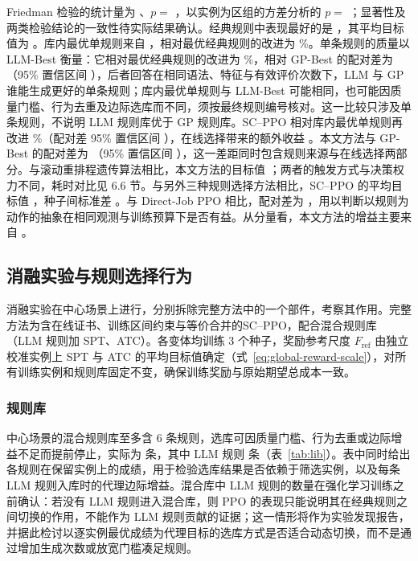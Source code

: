 Friedman 检验的统计量为 \tbd[※]、$p=$ \tbd[※]，以实例为区组的方差分析的 $p=$ \tbd[※]；显著性及两类检验结论的一致性待实际结果确认。经典规则中表现最好的是 \tbd[规则名]，其平均目标值为 \tbd[※]。库内最优单规则来自 ，相对最优经典规则的改进为 \tbd[※]\%。单条规则的质量以 LLM-Best 衡量：它相对最优经典规则的改进为 \tbd[※]\%，相对 GP-Best 的配对差为 \tbd[※]（95\% 置信区间 \tbd[※]），后者回答在相同语法、特征与有效评价次数下，LLM 与 GP 谁能生成更好的单条规则；库内最优单规则与 LLM-Best 可能相同，也可能因质量门槛、行为去重及边际选库而不同，须按最终规则编号核对。这一比较只涉及单条规则，不说明 LLM 规则库优于 GP 规则库。SC--PPO 相对库内最优单规则再改进 \tbd[※]\%（配对差 95\% 置信区间 \tbd[※]），在线选择带来的额外收益 \tbd[显著/不显著]。本文方法与 GP-Best 的配对差为 \tbd[※]（95\% 置信区间 \tbd[※]），这一差距同时包含规则来源与在线选择两部分。与滚动重排程遗传算法相比，本文方法的目标值 \tbd[更低/相当/更高]；两者的触发方式与决策权力不同，耗时对比见 6.6 节。与另外三种规则选择方法相比，SC--PPO 的平均目标值 \tbd[※]，种子间标准差 \tbd[※]。与 Direct-Job PPO 相比，配对差为 \tbd[※]，用以判断以规则为动作的抽象在相同观测与训练预算下是否有益。从分量看，本文方法的增益主要来自 \tbd[WSF/TT]。

\subsection{消融实验与规则选择行为}

消融实验在中心场景上进行，分别拆除完整方法中的一个部件，考察其作用。完整方法为含在线证书、训练区间约束与等价合并的SC--PPO，配合混合规则库（LLM 规则加 SPT、ATC）。各变体均训练 3 个种子，奖励参考尺度 $F_{\mathrm{ref}}$ 由独立校准实例上 SPT 与 ATC 的平均目标值确定（式~\eqref{eq:global-reward-scale}），对所有训练实例和规则库固定不变，确保训练奖励与原始期望总成本一致。

\subsubsection{规则库}

中心场景的混合规则库至多含 6 条规则，选库可因质量门槛、行为去重或边际增益不足而提前停止，实际为 \tbd[※] 条，其中 LLM 规则 \tbd[※] 条（表~\ref{tab:lib}）。表中同时给出各规则在保留实例上的成绩，用于检验选库结果是否依赖于筛选实例，以及每条 LLM 规则入库时的代理边际增益。混合库中 LLM 规则的数量在强化学习训练之前确认：若没有 LLM 规则进入混合库，则 PPO 的表现只能说明其在经典规则之间切换的作用，不能作为 LLM 规则贡献的证据；这一情形将作为实验发现报告，并据此检讨以逐实例最优成绩为代理目标的选库方式是否适合动态切换，而不是通过增加生成次数或放宽门槛凑足规则。

